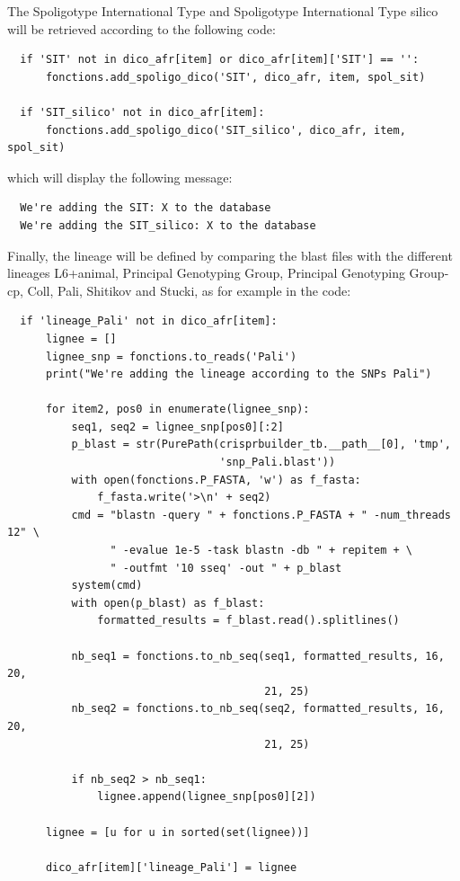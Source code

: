 \documentclass[twoside,a4paper,11pt,frenchb,openany]{report}
\begin{document}
    The Spoligotype International Type and Spoligotype International Type
silico will be retrieved according to the following code:

\begin{verbatim}
  if 'SIT' not in dico_afr[item] or dico_afr[item]['SIT'] == '':
      fonctions.add_spoligo_dico('SIT', dico_afr, item, spol_sit)

  if 'SIT_silico' not in dico_afr[item]:
      fonctions.add_spoligo_dico('SIT_silico', dico_afr, item, spol_sit)
\end{verbatim}

    which will display the following message:

    \begin{verbatim}
  We're adding the SIT: X to the database
  We're adding the SIT_silico: X to the database
\end{verbatim}

    Finally, the lineage will be defined by comparing the blast files with
the different lineages L6+animal, Principal Genotyping Group, Principal
Genotyping Group-cp, Coll, Pali, Shitikov and Stucki, as for example in
the code:

\begin{verbatim}
  if 'lineage_Pali' not in dico_afr[item]:
      lignee = []
      lignee_snp = fonctions.to_reads('Pali')
      print("We're adding the lineage according to the SNPs Pali")

      for item2, pos0 in enumerate(lignee_snp):
          seq1, seq2 = lignee_snp[pos0][:2]
          p_blast = str(PurePath(crisprbuilder_tb.__path__[0], 'tmp',
                                 'snp_Pali.blast'))
          with open(fonctions.P_FASTA, 'w') as f_fasta:
              f_fasta.write('>\n' + seq2)
          cmd = "blastn -query " + fonctions.P_FASTA + " -num_threads 12" \
                " -evalue 1e-5 -task blastn -db " + repitem + \
                " -outfmt '10 sseq' -out " + p_blast
          system(cmd)
          with open(p_blast) as f_blast:
              formatted_results = f_blast.read().splitlines()

          nb_seq1 = fonctions.to_nb_seq(seq1, formatted_results, 16, 20,
                                        21, 25)
          nb_seq2 = fonctions.to_nb_seq(seq2, formatted_results, 16, 20,
                                        21, 25)

          if nb_seq2 > nb_seq1:
              lignee.append(lignee_snp[pos0][2])

      lignee = [u for u in sorted(set(lignee))]

      dico_afr[item]['lineage_Pali'] = lignee
\end{verbatim}
\end{document}
